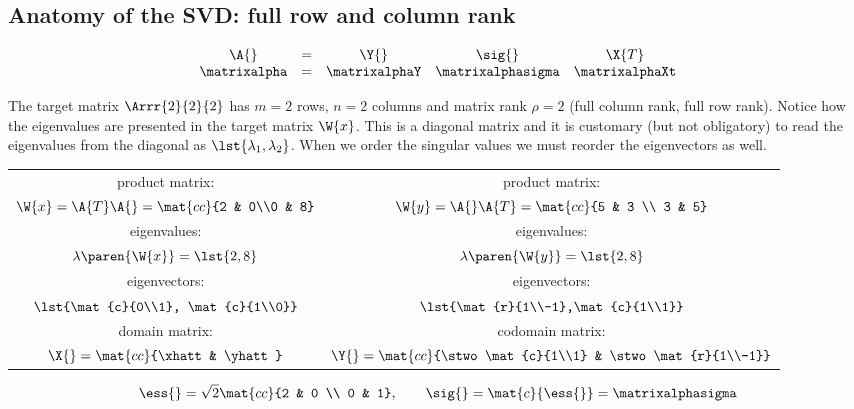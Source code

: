 \subsection[Anatomy of the SVD: full row, column rank]{Anatomy of the SVD: full row and column rank}

\begin{equation*}
  \begin{array}{ccccc}
    \A{} &=& \Y{} & \sig{} & \X{T} \\
    \matrixalpha & = & \matrixalphaY & \matrixalphasigma & \matrixalphaXt
  \end{array}
\end{equation*}

The target matrix $\Arrr{2}{2}{2}$ has $m=2$ rows, $n=2$ columns and matrix rank $\rho = 2$ (full column rank, full row rank). Notice how the eigenvalues are presented in the target matrix $\W{x}$. This is a diagonal matrix and it is customary (but not obligatory) to read the eigenvalues from the diagonal as $\lst{\lambda_{1}, \lambda_{2}}$. When we order the singular values we must reorder the eigenvectors as well.

\begin{table}[htdp]
\begin{center}
\begin{tabular}{c|c}
product matrix: & product matrix: \\
$\W{x} = \A{T}\A{} = \mat{cc}{2 & 0\\0 & 8}$ &
$\W{y} = \A{}\A{T} = \mat{cc}{5 & 3 \\ 3 & 5}$ \\[30pt]
eigenvalues: & eigenvalues: \\
$\lambda\paren{\W{x}} = \lst{2,8}$ &
$\lambda\paren{\W{y}} = \lst{2,8}$ \\[20pt]
eigenvectors: & eigenvectors: \\
$\lst{\mat{c}{0\\1}, \mat{c}{1\\0}}$ &
$\lst{\mat{r}{1\\-1},\mat{c}{1\\1}}$ \\[30pt]
domain matrix: & codomain matrix: \\
$\X{} = \mat{cc}{\xhatt & \yhatt}$ &
$\Y{} = \mat{cc}{\stwo\mat{c}{1\\1} & \stwo\mat{r}{1\\-1}}$\\[25pt]
\end{tabular}
\end{center}
\label{default}
\end{table}%

\begin{equation*}
  \ess{} = \sqrt{2} \mat{cc}{2 & 0 \\ 0 & 1}, \qquad \sig{}= \mat{c}{\ess{}} = \matrixalphasigma
\end{equation*}\endinput